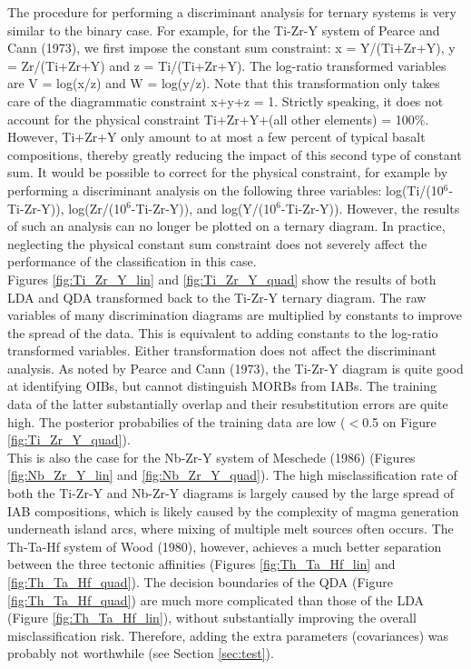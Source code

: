 \documentclass{article}
\begin{document}
The  procedure  for performing  a  discriminant  analysis for  ternary
systems  is very similar  to the  binary case.   For example,  for the
Ti-Zr-Y system of Pearce and Cann (1973), we first impose the constant
sum  constraint:   x  =  Y/(Ti+Zr+Y),   y  =  Zr/(Ti+Zr+Y)  and   z  =
Ti/(Ti+Zr+Y).  The  log-ratio transformed  variables are V  = log(x/z)
and W = log(y/z). Note that this transformation only takes care of the
diagrammatic  constraint x+y+z =  1.  Strictly  speaking, it  does not
account  for the  physical constraint  Ti+Zr+Y+(all other  elements) =
100\%.   However, Ti+Zr+Y  only amount  to at  most a  few  percent of
typical basalt  compositions, thereby  greatly reducing the  impact of
this second type of constant sum.  It would be possible to correct for
the  physical constraint,  for  example by  performing a  discriminant
analysis on  the following three  variables: log(Ti/(10$^6$-Ti-Zr-Y)),
log(Zr/(10$^6$-Ti-Zr-Y)),  and  log(Y/(10$^6$-Ti-Zr-Y)). However,  the
results of  such an  analysis can  no longer be  plotted on  a ternary
diagram. In practice, neglecting  the physical constant sum constraint
does not severely affect the performance of the classification in this
case.\\

Figures  \ref{fig:Ti_Zr_Y_lin}  and  \ref{fig:Ti_Zr_Y_quad}  show  the
results of  both LDA and QDA  transformed back to  the Ti-Zr-Y ternary
diagram.   The  raw  variables  of many  discrimination  diagrams  are
multiplied by  constants to improve the  spread of the  data.  This is
equivalent to adding constants to the log-ratio transformed variables.
Either transformation  does not affect the  discriminant analysis.  As
noted by Pearce and Cann (1973),  the Ti-Zr-Y diagram is quite good at
identifying  OIBs,  but  cannot  distinguish  MORBs  from  IABs.   The
training  data   of  the   latter  substantially  overlap   and  their
resubstitution errors  are quite  high.  The posterior  probabilies of
the training data are low ($<$0.5 on Figure \ref{fig:Ti_Zr_Y_quad}).\\

This  is also  the  case for  the  Nb-Zr-Y system  of Meschede  (1986)
(Figures \ref{fig:Nb_Zr_Y_lin}  and \ref{fig:Nb_Zr_Y_quad}).  The high
misclassification  rate of both  the Ti-Zr-Y  and Nb-Zr-Y  diagrams is
largely  caused by  the large  spread  of IAB  compositions, which  is
likely caused by the  complexity of magma generation underneath island
arcs,  where  mixing  of  multiple  melt sources  often  occurs.   The
Th-Ta-Hf  system  of Wood  (1980),  however,  achieves  a much  better
separation   between   the    three   tectonic   affinities   (Figures
\ref{fig:Th_Ta_Hf_lin}  and  \ref{fig:Th_Ta_Hf_quad}).   The  decision
boundaries of  the QDA (Figure \ref{fig:Th_Ta_Hf_quad})  are much more
complicated  than those  of the  LDA  (Figure \ref{fig:Th_Ta_Hf_lin}),
without  substantially improving  the overall  misclassification risk.
Therefore, adding the extra  parameters (covariances) was probably not
worthwhile (see Section \ref{sec:test}).
\end{document}
